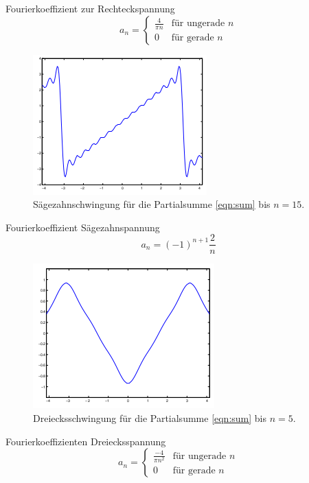 Fourierkoeffizient zur Rechteckspannung
\begin{equation}
  a_n =
  \begin{cases}
      \frac{4}{\pi n} & \text{für ungerade } n\\
      0 & \text{für gerade } n
  \end{cases}
\end{equation}
\begin{figure}[H]
  \centering
  \includegraphics{content/images/saege_theo_n=15.png}
  \caption{Sägezahnschwingung für die Partialsumme \eqref{eqn:sum} bis $n=15$\cite{koeff}.}
  \label{fig:saege_theo}
\end{figure}
Fourierkoeffizient Sägezahnspannung
\begin{equation}
  a_n = (-1)^{n+1}\frac{2}{n}
\end{equation}
\begin{figure}[H]
  \centering
  \includegraphics{content/images/dreieck_theo_n=5.png}
  \caption{Dreiecksschwingung für die Partialsumme \eqref{eqn:sum} bis $n=5$\cite{koeff}.}
  \label{fig:dreieck_theo}
\end{figure}
Fourierkoeffizienten Dreiecksspannung
\begin{equation}
  a_n =
  \begin{cases}
    \frac{-4}{\pi n^2} & \text{für ungerade }n\\
    0 & \text{für gerade }n
  \end{cases}
\end{equation}
